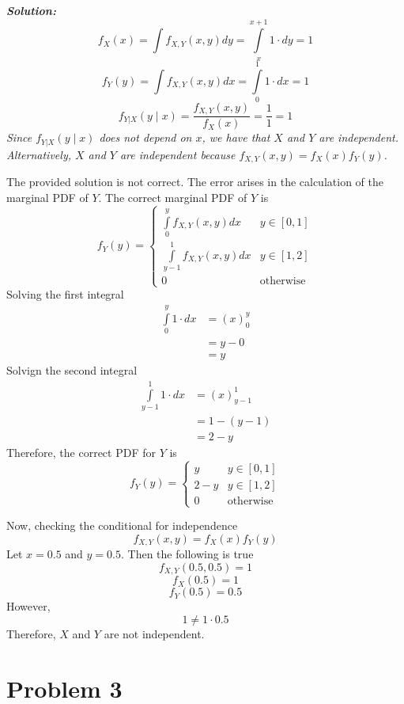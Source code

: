 \documentclass{article}
\begin{document}
\bigbreak

\textit{\textbf{Solution:}}
$$ f_X(x) = \int f_{X,Y}(x, y) dy = \int\limits_x^{x + 1} 1 \cdot dy = 1 $$
$$ f_Y(y) = \int f_{X,Y}(x, y) dx = \int\limits_0^1 1 \cdot dx = 1 $$
$$ f_{Y|X}(y \mid x) = \frac{f_{X,Y}(x, y)}{f_X(x)} = \frac{1}{1} = 1 $$
\textit{Since $f_{Y|X}(y \mid x)$ does not depend on $x$, we have that $X$
and $Y$ are independent. Alternatively, $X$ and $Y$ are independent because
$f_{X,Y}(x, y) = f_X(x) f_Y(y)$.}

\bigbreak

The provided solution is not correct. The error arises in the calculation of
the marginal PDF of $Y$. The correct marginal PDF of $Y$ is
$$ f_Y(y) = \begin{cases}
    \int\limits_0^y f_{X,Y}(x, y) dx & y \in [0, 1] \\
    \int\limits_{y - 1}^1 f_{X,Y}(x, y) dx & y \in [1, 2] \\
    0 & \mathrm{otherwise}
\end{cases} $$
Solving the first integral
\begin{align*}
    \int\limits_0^y 1 \cdot dx &= \left( x \right)_0^y \\
    &= y - 0 \\
    &= y
\end{align*}
Solvign the second integral
\begin{align*}
    \int\limits_{y - 1}^1 1 \cdot dx &= \left( x \right)_{y - 1}^1 \\
    &= 1 - (y - 1) \\
    &= 2 - y
\end{align*}
Therefore, the correct PDF for $Y$ is
$$ f_Y(y) = \begin{cases}
    y & y \in [0, 1] \\
    2 - y & y \in [1, 2] \\
    0 & \mathrm{otherwise}
\end{cases} $$

Now, checking the conditional for independence
$$ f_{X,Y}(x, y) = f_X(x) f_Y(y) $$
Let $x = 0.5$ and $y = 0.5$. Then the following is true
$$ f_{X,Y}(0.5, 0.5) = 1 $$
$$ f_X(0.5) = 1 $$
$$ f_Y(0.5) = 0.5 $$
However,
$$ 1 \neq 1 \cdot 0.5 $$ 
Therefore, $X$ and $Y$ are not independent.

\section*{Problem 3}
\end{document}
